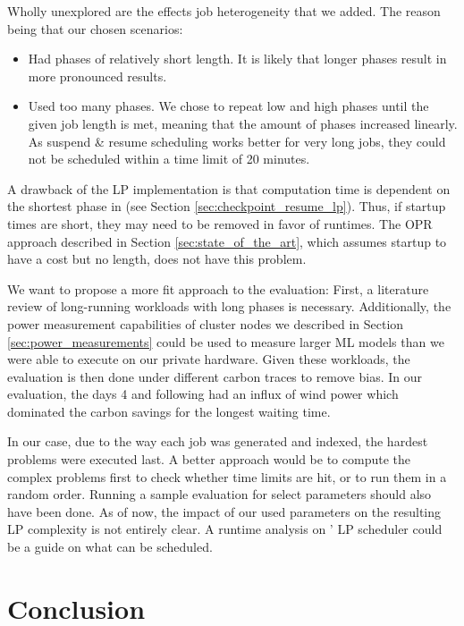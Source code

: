Wholly unexplored are the effects job heterogeneity that we added.
The reason being that our chosen scenarios:

\begin{itemize}
    \item Had phases of relatively short length. It is likely that longer phases result in more pronounced results.
    \item Used too many phases. We chose to repeat low and high phases until the given job length is met, meaning that the amount of phases increased linearly. As suspend \& resume scheduling works better for very long jobs, they could not be scheduled within a time limit of 20 minutes.
\end{itemize}

A drawback of the LP implementation is that computation time is dependent on the shortest phase in \modelname{} (see Section \ref{sec:checkpoint_resume_lp}). Thus, if startup times are short, they may need to be removed in favor of runtimes. The OPR approach described in Section \ref{sec:state_of_the_art}, which assumes startup to have a cost but no length, does not have this problem.

We want to propose a more fit approach to the evaluation:
First, a literature review of long-running workloads with long phases is necessary. Additionally, the power measurement capabilities of cluster nodes we described in Section \ref{sec:power_measurements} could be used to measure larger ML models than we were able to execute on our private hardware.
Given these workloads, the evaluation is then done under different carbon traces to remove bias.
In our evaluation, the days 4 and following had an influx of wind power which dominated the carbon savings for the longest waiting time. 

In our case, due to the way each job was generated and indexed, the hardest problems were executed last. 
A better approach would be to compute the complex problems first to check whether time limits are hit, or to run them in a random order.
Running a sample evaluation for select parameters should also have been done.
As of now, the impact of our used parameters on the resulting LP complexity is not entirely clear.
A runtime analysis on \programname{}' LP scheduler could be a guide on what can be scheduled.

\section{Conclusion}



